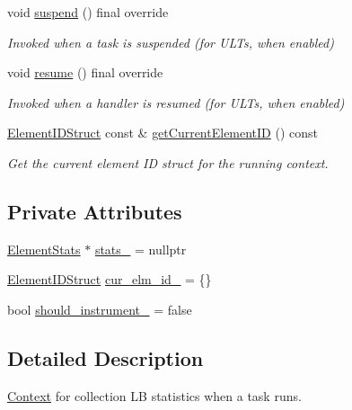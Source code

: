 \begin{DoxyCompactItemize}
void \hyperlink{structvt_1_1ctx_1_1_l_b_stats_a15d4c77ea06465f8e3a0b51c90bc6ddc}{suspend} () final override
\begin{DoxyCompactList}\small\item\em Invoked when a task is suspended (for U\+L\+Ts, when enabled) \end{DoxyCompactList}\item 
void \hyperlink{structvt_1_1ctx_1_1_l_b_stats_a099850f1bd53aafe650ed9e3958ca54b}{resume} () final override
\begin{DoxyCompactList}\small\item\em Invoked when a handler is resumed (for U\+L\+Ts, when enabled) \end{DoxyCompactList}\item 
\hyperlink{structvt_1_1ctx_1_1_l_b_stats_a2ba0297a3c99e495b74b73abbf888bde}{Element\+I\+D\+Struct} const  \& \hyperlink{structvt_1_1ctx_1_1_l_b_stats_acfcb5bb3b554fa1992525ec04d46b69e}{get\+Current\+Element\+ID} () const
\begin{DoxyCompactList}\small\item\em Get the current element ID struct for the running context. \end{DoxyCompactList}\end{DoxyCompactItemize}
\subsection*{Private Attributes}
\begin{DoxyCompactItemize}
\item 
\hyperlink{structvt_1_1ctx_1_1_l_b_stats_ae1eb05f8cd4ad63a08ff3cf87ef34e1d}{Element\+Stats} $\ast$ \hyperlink{structvt_1_1ctx_1_1_l_b_stats_a3cbfd8600aa3ba4284e3d2a6c4c7f07a}{stats\+\_\+} = nullptr
\item 
\hyperlink{structvt_1_1ctx_1_1_l_b_stats_a2ba0297a3c99e495b74b73abbf888bde}{Element\+I\+D\+Struct} \hyperlink{structvt_1_1ctx_1_1_l_b_stats_a54123d2d08b4dae9568a04697d400db7}{cur\+\_\+elm\+\_\+id\+\_\+} = \{\}
\item 
bool \hyperlink{structvt_1_1ctx_1_1_l_b_stats_ace63b8b294d303b5055a78a07ede6f5c}{should\+\_\+instrument\+\_\+} = false
\end{DoxyCompactItemize}


\subsection{Detailed Description}
\hyperlink{structvt_1_1ctx_1_1_context}{Context} for collection LB statistics when a task runs. 

